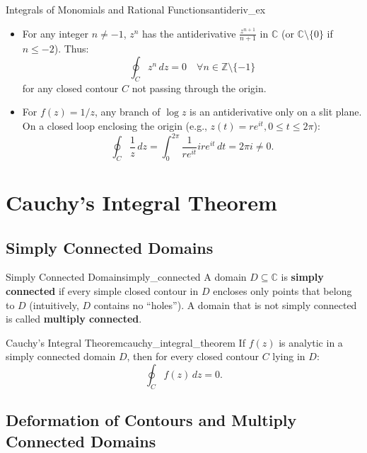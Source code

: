 \begin{example}{Integrals of Monomials and Rational Functions}{antideriv_ex}
\begin{itemize}
    \item For any integer $n \neq -1$, $z^n$ has the antiderivative $\frac{z^{n+1}}{n+1}$ in $\mathbb{C}$ (or $\mathbb{C} \setminus \{0\}$ if $n \le -2$). Thus:
    \begin{equation}
    \oint_C z^n\, dz = 0 \quad \forall n \in \mathbb{Z} \setminus \{-1\}
    \end{equation}
    for any closed contour $C$ not passing through the origin.
    \item For $f(z) = 1/z$, any branch of $\log z$ is an antiderivative only on a slit plane. On a closed loop enclosing the origin (e.g., $z(t) = r e^{it}, 0 \le t \le 2\pi$):
    \begin{equation}
    \oint_C \frac{1}{z}\, dz = \int_0^{2\pi} \frac{1}{r e^{it}} i r e^{it}\, dt = 2\pi i \neq 0.
    \end{equation}
\end{itemize}
\end{example}


\section{Cauchy's Integral Theorem}

\subsection{Simply Connected Domains}

\begin{definition}{Simply Connected Domain}{simply_connected}
A domain $D \subseteq \mathbb{C}$ is \textbf{simply connected} if every simple closed contour in $D$ encloses only points that belong to $D$ (intuitively, $D$ contains no ``holes'').
A domain that is not simply connected is called \textbf{multiply connected}.
\end{definition}

\begin{theorem}{Cauchy's Integral Theorem}{cauchy_integral_theorem}
If $f(z)$ is analytic in a simply connected domain $D$, then for every closed contour $C$ lying in $D$:
\begin{equation}
\oint_C f(z)\, dz = 0.
\end{equation}
\end{theorem}

\subsection{Deformation of Contours and Multiply Connected Domains}

